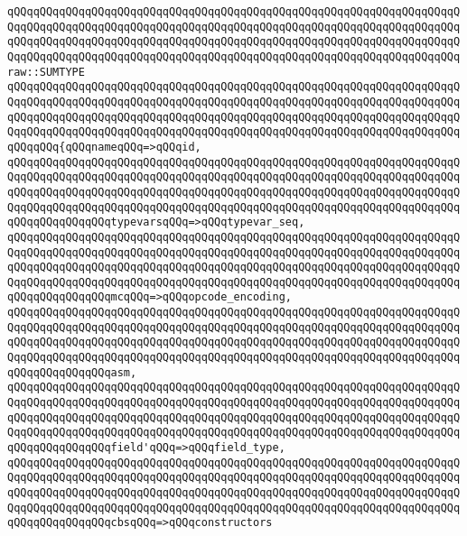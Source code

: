 \newline
\verb|qQQqqQQqqQQqqQQqqQQqqQQqqQQqqQQqqQQqqQQqqQQqqQQqqQQqqQQqqQQqqQQqqQQqqQQqqQQqqQQqqQQqqQQqqQQqqQQqqQQqqQQqqQQqqQQqqQQqqQQqqQQqqQQqqQQqqQQqqQQqqQQqqQQqqQQqqQQqqQQqqQQqqQQqqQQqqQQqqQQqqQQqqQQqqQQqqQQqqQQqqQQqqQQqqQQqqQQqqQQqqQQqqQQqqQQqqQQqqQQqqQQqqQQqqQQqqQQqqQQqqQQqqQQqqQQqqQQqqQQqraw::SUMTYPE|\newline
\verb|qQQqqQQqqQQqqQQqqQQqqQQqqQQqqQQqqQQqqQQqqQQqqQQqqQQqqQQqqQQqqQQqqQQqqQQqqQQqqQQqqQQqqQQqqQQqqQQqqQQqqQQqqQQqqQQqqQQqqQQqqQQqqQQqqQQqqQQqqQQqqQQqqQQqqQQqqQQqqQQqqQQqqQQqqQQqqQQqqQQqqQQqqQQqqQQqqQQqqQQqqQQqqQQqqQQqqQQqqQQqqQQqqQQqqQQqqQQqqQQqqQQqqQQqqQQqqQQqqQQqqQQqqQQqqQQqqQQqqQQqqQQqqQQq{qQQqnameqQQq=>qQQqid,|\newline
\verb|qQQqqQQqqQQqqQQqqQQqqQQqqQQqqQQqqQQqqQQqqQQqqQQqqQQqqQQqqQQqqQQqqQQqqQQqqQQqqQQqqQQqqQQqqQQqqQQqqQQqqQQqqQQqqQQqqQQqqQQqqQQqqQQqqQQqqQQqqQQqqQQqqQQqqQQqqQQqqQQqqQQqqQQqqQQqqQQqqQQqqQQqqQQqqQQqqQQqqQQqqQQqqQQqqQQqqQQqqQQqqQQqqQQqqQQqqQQqqQQqqQQqqQQqqQQqqQQqqQQqqQQqqQQqqQQqqQQqqQQqqQQqqQQqqQQqqQQqtypevarsqQQq=>qQQqtypevar_seq,|\newline
\verb|qQQqqQQqqQQqqQQqqQQqqQQqqQQqqQQqqQQqqQQqqQQqqQQqqQQqqQQqqQQqqQQqqQQqqQQqqQQqqQQqqQQqqQQqqQQqqQQqqQQqqQQqqQQqqQQqqQQqqQQqqQQqqQQqqQQqqQQqqQQqqQQqqQQqqQQqqQQqqQQqqQQqqQQqqQQqqQQqqQQqqQQqqQQqqQQqqQQqqQQqqQQqqQQqqQQqqQQqqQQqqQQqqQQqqQQqqQQqqQQqqQQqqQQqqQQqqQQqqQQqqQQqqQQqqQQqqQQqqQQqqQQqqQQqqQQqqQQqmcqQQq=>qQQqopcode_encoding,|\newline
\verb|qQQqqQQqqQQqqQQqqQQqqQQqqQQqqQQqqQQqqQQqqQQqqQQqqQQqqQQqqQQqqQQqqQQqqQQqqQQqqQQqqQQqqQQqqQQqqQQqqQQqqQQqqQQqqQQqqQQqqQQqqQQqqQQqqQQqqQQqqQQqqQQqqQQqqQQqqQQqqQQqqQQqqQQqqQQqqQQqqQQqqQQqqQQqqQQqqQQqqQQqqQQqqQQqqQQqqQQqqQQqqQQqqQQqqQQqqQQqqQQqqQQqqQQqqQQqqQQqqQQqqQQqqQQqqQQqqQQqqQQqqQQqqQQqqQQqqQQqasm,|\newline
\verb|qQQqqQQqqQQqqQQqqQQqqQQqqQQqqQQqqQQqqQQqqQQqqQQqqQQqqQQqqQQqqQQqqQQqqQQqqQQqqQQqqQQqqQQqqQQqqQQqqQQqqQQqqQQqqQQqqQQqqQQqqQQqqQQqqQQqqQQqqQQqqQQqqQQqqQQqqQQqqQQqqQQqqQQqqQQqqQQqqQQqqQQqqQQqqQQqqQQqqQQqqQQqqQQqqQQqqQQqqQQqqQQqqQQqqQQqqQQqqQQqqQQqqQQqqQQqqQQqqQQqqQQqqQQqqQQqqQQqqQQqqQQqqQQqqQQqqQQqfield'qQQq=>qQQqfield_type,|\newline
\verb|qQQqqQQqqQQqqQQqqQQqqQQqqQQqqQQqqQQqqQQqqQQqqQQqqQQqqQQqqQQqqQQqqQQqqQQqqQQqqQQqqQQqqQQqqQQqqQQqqQQqqQQqqQQqqQQqqQQqqQQqqQQqqQQqqQQqqQQqqQQqqQQqqQQqqQQqqQQqqQQqqQQqqQQqqQQqqQQqqQQqqQQqqQQqqQQqqQQqqQQqqQQqqQQqqQQqqQQqqQQqqQQqqQQqqQQqqQQqqQQqqQQqqQQqqQQqqQQqqQQqqQQqqQQqqQQqqQQqqQQqqQQqqQQqqQQqqQQqcbsqQQq=>qQQqconstructors|\newline
